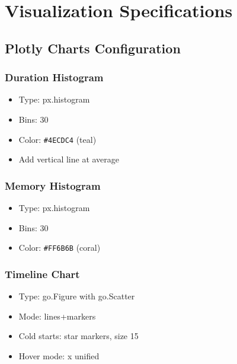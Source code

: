 \documentclass[12pt,a4paper]{article}
\begin{document}
\pagebreak

\section{Visualization Specifications}

\subsection{Plotly Charts Configuration}

\subsubsection{Duration Histogram}
\begin{itemize}
    \item Type: px.histogram
    \item Bins: 30
    \item Color: \texttt{\#4ECDC4} (teal)
    \item Add vertical line at average
\end{itemize}

\subsubsection{Memory Histogram}
\begin{itemize}
    \item Type: px.histogram
    \item Bins: 30
    \item Color: \texttt{\#FF6B6B} (coral)
\end{itemize}

\subsubsection{Timeline Chart}
\begin{itemize}
    \item Type: go.Figure with go.Scatter
    \item Mode: lines+markers
    \item Cold starts: star markers, size 15
    \item Hover mode: x unified
\end{itemize}

\pagebreak
\end{document}
